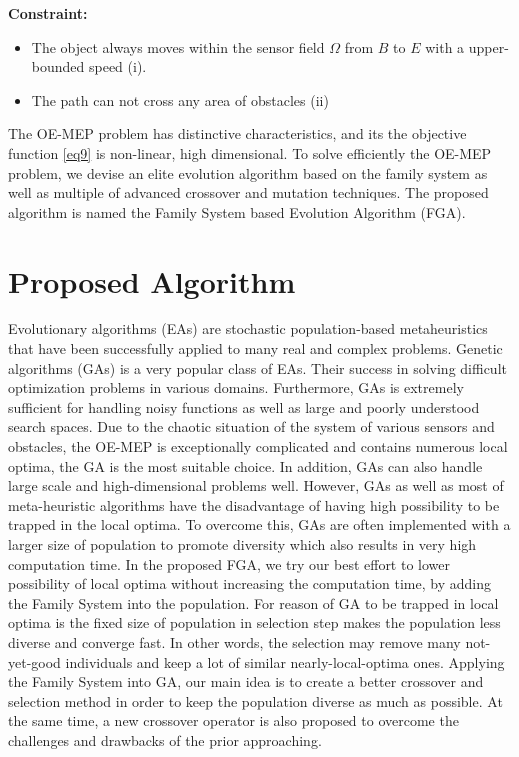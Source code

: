 \documentclass[final]{elsarticle}
\begin{document}
\textbf{Constraint:}	
\begin{itemize}
	\item The object always moves within the sensor field $\Omega $ from $B$ to $E$ with a upper-bounded speed (i).
	\item The path can not cross any area of obstacles  (ii)
\end{itemize}
	
The OE-MEP problem has distinctive characteristics, and its the objective function \eqref{eq9} is non-linear, high dimensional. To solve efficiently the OE-MEP problem, we devise an elite evolution algorithm based on the family system as well as multiple of advanced crossover and mutation techniques. The proposed algorithm is named the Family System based Evolution Algorithm (FGA).

\section{Proposed Algorithm}
Evolutionary algorithms (EAs) are stochastic population-based metaheuristics that have been successfully applied to many real and complex problems. Genetic algorithms (GAs) is a very popular class of EAs. Their success in solving difficult optimization problems in various domains. Furthermore, GAs is extremely sufficient for handling noisy functions as well as large and poorly understood search spaces. Due to the chaotic situation of the system of various sensors and obstacles, the OE-MEP is exceptionally complicated and contains numerous local optima, the GA is the most suitable choice. In addition, GAs can also handle large scale and high-dimensional problems well. However, GAs as well as most of meta-heuristic algorithms have the disadvantage of having high possibility to be trapped in the local optima. To overcome this, GAs are often implemented with a larger size of population to promote diversity which also results in very high computation time. In the proposed FGA, we try our best effort to lower possibility of local optima without increasing the computation time, by adding the Family System into the population. For reason of GA to be trapped in local optima is the fixed size of population in selection step makes the population less diverse and converge fast. In other words, the selection may remove many not-yet-good individuals and keep a lot of similar nearly-local-optima ones. Applying the Family System into GA, our main idea is to create a better crossover and selection method in order to keep the population diverse as much as possible. At the same time, a new crossover operator is also proposed to overcome the challenges and drawbacks of the prior approaching.
\end{document}

